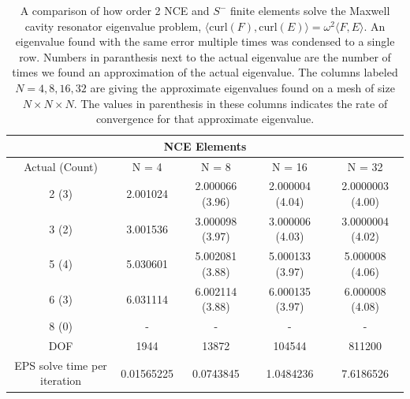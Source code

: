 \documentclass[format=acmsmall,screen,timestamp=false,a4paper]{acmart}
\begin{document}
\begin{table}[htbp]
  \centering
  \caption{A comparison of how order 2 NCE and $S^-$ finite elements solve the Maxwell cavity resonator eigenvalue problem, $\langle \text{curl}(F), \text{curl}(E) \rangle = \omega^2 \langle F, E \rangle$. An eigenvalue found with the same error multiple times was condensed to a single row.  Numbers in paranthesis next to the actual eigenvalue are the number of times we found an approximation of the actual eigenvalue.  The columns labeled $N=4, 8, 16, 32$ are giving the approximate eigenvalues found on a mesh of size $N \times N \times N$.  The values in parenthesis in these columns indicates the rate of convergence for that approximate eigenvalue.
\label{tab:Eigenvalue} }
\begin{tabular}{ c c c c c }
\multicolumn{5}{c}{NCE Elements} \\
\hline
Actual (Count) & N = 4 & N = 8 & N = 16 & N = 32 \\ 
\hline
2 (3) &2.001024 & 2.000066 (3.96) & 2.000004 (4.04) & 2.0000003 (4.00) \\  
3 (2) & 3.001536 & 3.000098 (3.97) & 3.000006 (4.03) & 3.0000004 (4.02) \\
5 (4) & 5.030601 & 5.002081 (3.88)& 5.000133 (3.97) & 5.000008 (4.06) \\
6 (3) & 6.031114 & 6.002114 (3.88) & 6.000135 (3.97) &  6.000008 (4.08) \\
8 (0) & - & -& - & - \\
\hline
DOF  & 1944 & 13872 & 104544 & 811200 \\
\hline
EPS solve time per iteration & 0.01565225 & 0.0743845 & 1.0484236 & 7.6186526 \\
\hline
\end{tabular} \\[1em]


\end{table}
\end{document}
